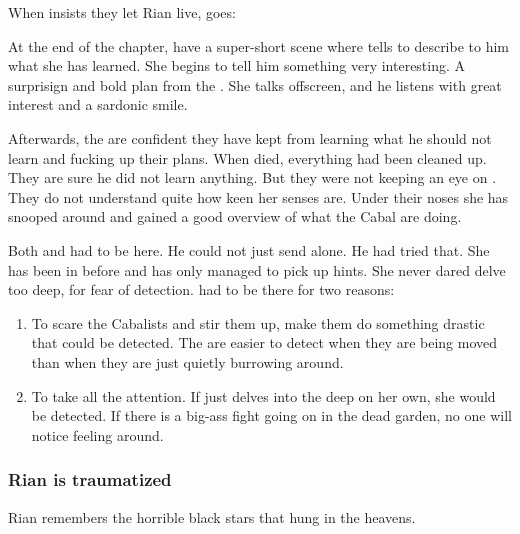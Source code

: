 When \Criseis{} insists they let Rian live, \Ishnaruchaefir{} goes:

At the end of the chapter, have a super-short scene where \Ishnaruchaefir tells \Criseis to describe to him what she has learned.
She begins to tell him something very interesting.
A surprisign and bold plan from the \resphain.
She talks offscreen, and he listens with great interest and a sardonic smile.

Afterwards, the \resphain are confident they have kept \Ishnaruchaefir from learning what he should not learn and fucking up their plans. 
When \Teshrial died, everything had been cleaned up.
They are sure he did not learn anything.
But they were not keeping an eye on \Criseis.
They do not understand quite how keen her senses are.
Under their noses she has snooped around and gained a good overview of what the Cabal are doing. 

Both \Ishnaruchaefir and \Criseis had to be here.
He could not just send \Criseis alone. 
He had tried that.
She has been in \Malcur before and has only managed to pick up hints.
She never dared delve too deep, for fear of detection. 
\Ishnaruchaefir had to be there for two reasons:
\begin{enumerate}
  \item 
    To scare the Cabalists and stir them up, make them do something drastic that could be detected. 
    The \noggyaleth are easier to detect when they are being moved than when they are just quietly burrowing around.
  \item 
    To take all the attention.
    If \Criseis just delves into the deep on her own, she would be detected. 
    If there is a big-ass fight going on in the dead garden, no one will notice \Criseis feeling around. 
\end{enumerate}





\subsubsection{Rian is traumatized}
Rian remembers the horrible black stars that hung in the heavens. 


